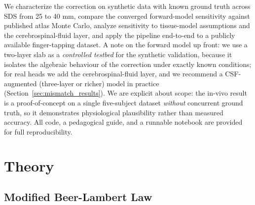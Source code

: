 \documentclass[11pt]{article}
\def\,{ }%
\begin{document}
We characterize the correction on synthetic data with known ground truth across SDS from 25 to 40\,mm, compare the converged forward-model sensitivity against published atlas Monte Carlo, analyze sensitivity to tissue-model assumptions and the cerebrospinal-fluid layer, and apply the pipeline end-to-end to a publicly available finger-tapping dataset. A note on the forward model up front: we use a two-layer slab as a \emph{controlled testbed} for the synthetic validation, because it isolates the algebraic behaviour of the correction under exactly known conditions; for real heads we add the cerebrospinal-fluid layer, and we recommend a CSF-augmented (three-layer or richer) model in practice (Section~\ref{sec:mismatch_results}). We are explicit about scope: the in-vivo result is a proof-of-concept on a single five-subject dataset \emph{without} concurrent ground truth, so it demonstrates physiological plausibility rather than measured accuracy. All code, a pedagogical guide, and a runnable notebook are provided for full reproducibility.

\section{Theory}

\subsection{Modified Beer-Lambert Law}
\end{document}
